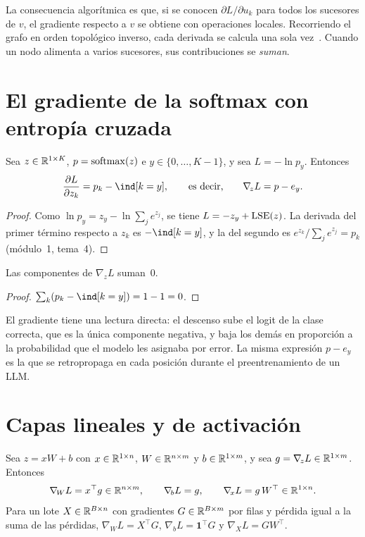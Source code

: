 La consecuencia algorítmica es que, si se conocen $\partial L/\partial u_k$ para todos los sucesores de $v$, el gradiente respecto a $v$ se obtiene con operaciones locales. Recorriendo el grafo en orden topológico inverso, cada derivada se calcula una sola vez~\cite[§6.5.3]{gbc}. Cuando un nodo alimenta a varios sucesores, sus contribuciones se \emph{suman}.

\section{El gradiente de la softmax con entropía cruzada}

\begin{proposicion}\label{prop:delta-salida}
Sea $z\in\mathbb{R}^{1\times K}$, $p=\operatorname{softmax}(z)$ e $y\in\{0,\dots,K-1\}$, y sea $L=-\ln p_y$. Entonces
\[
\frac{\partial L}{\partial z_k}=p_k-\ind[k=y],\qquad\text{es decir,}\qquad \nabla_{\!z}L=p-e_y.
\]
\end{proposicion}

\begin{proof}
Como $\ln p_y=z_y-\ln\sum_j e^{z_j}$, se tiene $L=-z_y+\operatorname{LSE}(z)$. La derivada del primer término respecto a $z_k$ es $-\ind[k=y]$, y la del segundo es $e^{z_k}/\sum_je^{z_j}=p_k$ (módulo~1, tema~4).
\end{proof}

\begin{corolario}\label{cor:suma-cero}
Las componentes de $\nabla_{\!z}L$ suman~0.
\end{corolario}

\begin{proof}
$\sum_k(p_k-\ind[k=y])=1-1=0$.
\end{proof}

El gradiente tiene una lectura directa: el descenso sube el logit de la clase correcta, que es la única componente negativa, y baja los demás en proporción a la probabilidad que el modelo les asignaba por error. La misma expresión $p-e_y$ es la que se retropropaga en cada posición durante el preentrenamiento de un LLM.

\section{Capas lineales y de activación}

\begin{proposicion}\label{prop:capa-lineal}
Sea $z=xW+b$ con $x\in\mathbb{R}^{1\times n}$, $W\in\mathbb{R}^{n\times m}$ y $b\in\mathbb{R}^{1\times m}$, y sea $g=\nabla_{\!z}L\in\mathbb{R}^{1\times m}$. Entonces
\[
\nabla_{\!W}L=x^{\top}g\in\mathbb{R}^{n\times m},\qquad \nabla_{\!b}L=g,\qquad \nabla_{\!x}L=g\,W^{\top}\in\mathbb{R}^{1\times n}.
\]
Para un lote $X\in\mathbb{R}^{B\times n}$ con gradientes $G\in\mathbb{R}^{B\times m}$ por filas y pérdida igual a la suma de las pérdidas, $\nabla_{\!W}L=X^{\top}G$, $\nabla_{\!b}L=\mathbf{1}^{\top}G$ y $\nabla_{\!X}L=GW^{\top}$.
\end{proposicion}

